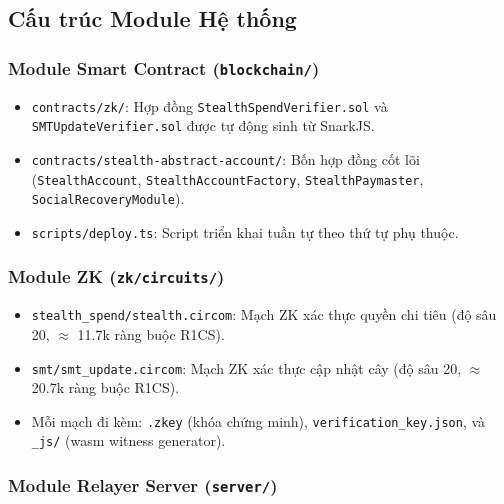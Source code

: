 \documentclass[../DoAn.tex]{subfiles}
\begin{document}
\subsection{Cấu trúc Module Hệ thống}
\label{subsec:module_structure}

\subsubsection{Module Smart Contract (\texttt{blockchain/})}

\begin{itemize}
    \item \texttt{contracts/zk/}: Hợp đồng \texttt{StealthSpendVerifier.sol} và \texttt{SMTUpdateVerifier.sol} được tự động sinh từ SnarkJS.
    \item \texttt{contracts/stealth-abstract-account/}: Bốn hợp đồng cốt lõi (\texttt{StealthAccount}, \texttt{StealthAccountFactory}, \texttt{StealthPaymaster}, \texttt{SocialRecoveryModule}).
    \item \texttt{scripts/deploy.ts}: Script triển khai tuần tự theo thứ tự phụ thuộc.
\end{itemize}

\subsubsection{Module ZK (\texttt{zk/circuits/})}

\begin{itemize}
    \item \texttt{stealth\_spend/stealth.circom}: Mạch ZK xác thực quyền chi tiêu (độ sâu 20, $\approx$ 11.7k ràng buộc R1CS).
    \item \texttt{smt/smt\_update.circom}: Mạch ZK xác thực cập nhật cây (độ sâu 20, $\approx$ 20.7k ràng buộc R1CS).
    \item Mỗi mạch đi kèm: \texttt{.zkey} (khóa chứng minh), \texttt{verification\_key.json}, và \texttt{\_js/} (wasm witness generator).
\end{itemize}

\subsubsection{Module Relayer Server (\texttt{server/})}
\end{document}
